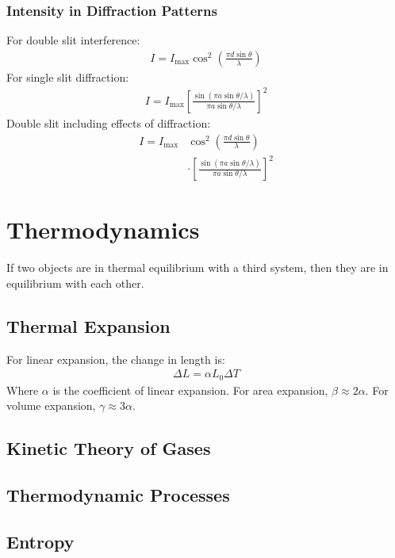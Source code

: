 \documentclass[11pt]{article}
\begin{document}
\begin{multicols*}{3}
\subsubsection{Intensity in Diffraction Patterns}
For double slit interference:
\begin{align*}
I = I_{\text{max}} \cos^2\left(\frac{\pi d \sin{\theta}}{\lambda} \right)
\end{align*}
For single slit diffraction:
\begin{align*}
I = I_{\text{max}} \left [\frac{\sin(\pi a \sin \theta / \lambda)}{\pi a \sin \theta / \lambda} \right]^2
\end{align*}
Double slit including effects of diffraction:
\begin{align*}
I = I_{\text{max}} &\cos^2\left(\frac{\pi d \sin{\theta}}{\lambda} \right) \\
&\cdot  \left [\frac{\sin(\pi a \sin \theta / \lambda)}{\pi a \sin \theta / \lambda} \right]^2
\end{align*}
	
\section{Thermodynamics}
If two objects are in thermal equilibrium with a third system, then they are in equilibrium with each other. 

\subsection{Thermal Expansion}
For linear expansion, the change in length is:
\begin{align*}
  \Delta L = \alpha L_0 \Delta T
\end{align*}
Where $\alpha$ is the coefficient of linear expansion. For area expansion, $\beta \approx 2 \alpha $. For volume expansion, $\gamma \approx 3 \alpha$.

\subsection{Kinetic Theory of Gases}


\subsection{Thermodynamic Processes}


\subsection{Entropy}




\end{multicols*}
\end{document}
